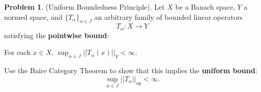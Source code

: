\documentclass[12pt]{article}
\theoremstyle{definition}
\newtheorem{ex}{Problem}
\begin{document}
\begin{ex}
	(Uniform Boundedness Principle).
	Let $X$ be a Banach space, $Y$ a normed space, and $\lbrace T_\alpha \rbrace_{\alpha \in J}$ an arbitrary family of bounded linear operators \begin{equation*}
		T_\alpha : X \to Y
	\end{equation*}
	satisfying the \textbf{pointwise bound}: \begin{center}
		For each $x \in X$, \hspace{0.5em} $\sup_{\alpha \in J}||T_\alpha(x)||_Y < \infty$.
	\end{center}
	Use the Baire Category Theorem to show that this implies the \textbf{uniform bound}: \begin{equation*}
		\sup_{\alpha \in J} ||T_\alpha||_{op} < \infty.
	\end{equation*}
\end{ex}
\end{document}
